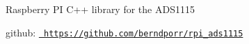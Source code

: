 \label{index_md_doxy}%
%
 Raspberry PI C++ library for the ADS1115

github\+: \href{https://github.com/berndporr/rpi_ads1115}{\texttt{ https\+://github.\+com/berndporr/rpi\+\_\+ads1115}} 